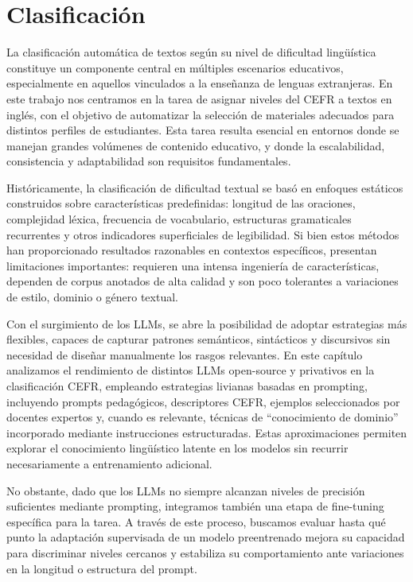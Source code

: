 \section{Clasificación}\label{sec:clasificacion}
La clasificación automática de textos según su nivel de dificultad lingüística constituye un componente central en múltiples escenarios educativos, especialmente en aquellos vinculados a la enseñanza de lenguas extranjeras. En este trabajo nos centramos en la tarea de asignar niveles del CEFR a textos en inglés, con el objetivo de automatizar la selección de materiales adecuados para distintos perfiles de estudiantes. Esta tarea resulta esencial en entornos donde se manejan grandes volúmenes de contenido educativo, y donde la escalabilidad, consistencia y adaptabilidad son requisitos fundamentales.

Históricamente, la clasificación de dificultad textual se basó en enfoques estáticos construidos sobre características predefinidas: longitud de las oraciones, complejidad léxica, frecuencia de vocabulario, estructuras gramaticales recurrentes y otros indicadores superficiales de legibilidad. Si bien estos métodos han proporcionado resultados razonables en contextos específicos, presentan limitaciones importantes: requieren una intensa ingeniería de características, dependen de corpus anotados de alta calidad y son poco tolerantes a variaciones de estilo, dominio o género textual.

Con el surgimiento de los LLMs, se abre la posibilidad de adoptar estrategias más flexibles, capaces de capturar patrones semánticos, sintácticos y discursivos sin necesidad de diseñar manualmente los rasgos relevantes. En este capítulo analizamos el rendimiento de distintos LLMs open-source y privativos en la clasificación CEFR, empleando estrategias livianas basadas en prompting, incluyendo prompts pedagógicos, descriptores CEFR, ejemplos seleccionados por docentes expertos y, cuando es relevante, técnicas de “conocimiento de dominio” incorporado mediante instrucciones estructuradas. Estas aproximaciones permiten explorar el conocimiento lingüístico latente en los modelos sin recurrir necesariamente a entrenamiento adicional.

No obstante, dado que los LLMs no siempre alcanzan niveles de precisión suficientes mediante prompting, integramos también una etapa de fine-tuning específica para la tarea. A través de este proceso, buscamos evaluar hasta qué punto la adaptación supervisada de un modelo preentrenado mejora su capacidad para discriminar niveles cercanos y estabiliza su comportamiento ante variaciones en la longitud o estructura del prompt.

